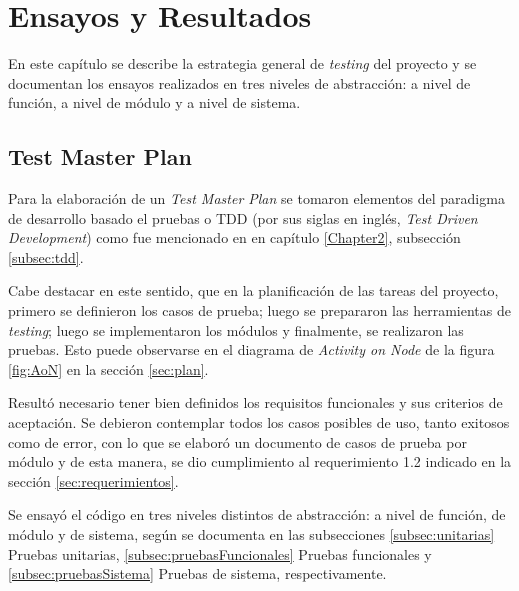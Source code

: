 
\chapter{Ensayos y Resultados} %

\label{Chapter4} %

En este capítulo se describe la estrategia general de \textit{testing} del proyecto y se documentan los ensayos realizados en tres niveles de abstracción: a nivel de función, a nivel de módulo y a nivel de sistema.


\section{Test Master Plan}
\label{sec:masterPlan}

Para la elaboración de un \textit{Test Master Plan} se tomaron elementos del paradigma de desarrollo basado el pruebas o TDD (por sus siglas en inglés, \textit{Test Driven Development}) como fue mencionado en en capítulo \ref{Chapter2}, subsección \ref{subsec:tdd}. 

Cabe destacar en este sentido, que en la planificación de las tareas del proyecto, primero se definieron los casos de prueba; luego se prepararon las herramientas de \textit{testing}; luego se implementaron los módulos y finalmente, se realizaron las pruebas. Esto puede observarse en el diagrama de \textit{Activity on Node} de la figura \ref{fig:AoN} en la sección \ref{sec:plan}.

Resultó necesario tener bien definidos los requisitos funcionales y sus criterios de aceptación.  Se debieron contemplar todos los casos posibles de uso, tanto exitosos como de error, con lo que se elaboró un documento \citep{TestMasterPlan} de casos de prueba por módulo  y de esta manera, se dio cumplimiento al requerimiento 1.2 indicado en la sección \ref{sec:requerimientos}.  

Se ensayó el código en tres niveles distintos de abstracción: a nivel de función, de módulo y de sistema, según se documenta en las subsecciones \ref{subsec:unitarias} Pruebas unitarias, \ref{subsec:pruebasFuncionales} Pruebas funcionales y \ref{subsec:pruebasSistema} Pruebas de sistema, respectivamente. 

